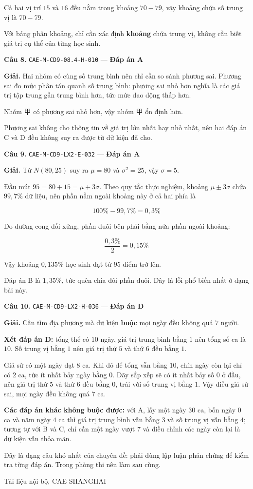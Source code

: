 \documentclass[11pt, a4paper]{article}
\begin{document}
Cả hai vị trí $15$ và $16$ đều nằm trong khoảng $70 - 79$, vậy khoảng chứa số trung vị là $70 - 79$.

 Với bảng phân khoảng, chỉ cần xác định \textbf{khoảng} chứa trung vị, không cần biết giá trị cụ thể của từng học sinh.

\textbf{Câu 8.} \texttt{CAE-M-CD9-08.4-H-010} — \textbf{Đáp án A}

\textbf{Giải.} Hai nhóm có cùng số trung bình nên chỉ cần so sánh phương sai. Phương sai đo mức phân tán quanh số trung bình: phương sai nhỏ hơn nghĩa là các giá trị tập trung gần trung bình hơn, tức mức dao động thấp hơn.

Nhóm 甲 có phương sai nhỏ hơn, vậy nhóm 甲 ổn định hơn.

 Phương sai không cho thông tin về giá trị lớn nhất hay nhỏ nhất, nên hai đáp án C và D đều không suy ra được từ dữ kiện đã cho.

\textbf{Câu 9.} \texttt{CAE-M-CD9-LX2-E-032} — \textbf{Đáp án A}

\textbf{Giải.} Từ $N(80, 25)$ suy ra $\mu = 80$ và $\sigma^2 = 25$, vậy $\sigma = 5$.

Đầu mút $95 = 80 + 15 = \mu + 3\sigma$. Theo quy tắc thực nghiệm, khoảng $\mu \pm 3\sigma$ chứa $99,7\%$ dữ liệu, nên phần nằm ngoài khoảng này ở cả hai phía là

$$100\% - 99,7\% = 0,3\%$$

Do đường cong đối xứng, phần đuôi bên phải bằng nửa phần ngoài khoảng:

$$\frac{0,3\%}{2} = 0,15\%$$

Vậy khoảng $0,135\%$ học sinh đạt từ $95$ điểm trở lên.

 Đáp án B là $1,35\%$, tức quên chia đôi phần đuôi. Đây là lỗi phổ biến nhất ở dạng bài này.

\textbf{Câu 10.} \texttt{CAE-M-CD9-LX2-H-036} — \textbf{Đáp án D}

\textbf{Giải.} Cần tìm địa phương mà dữ kiện \textbf{buộc} mọi ngày đều không quá $7$ người.

\textbf{Xét đáp án D:} tổng thể có $10$ ngày, giá trị trung bình bằng $1$ nên tổng số ca là $10$. Số trung vị bằng $1$ nên giá trị thứ $5$ và thứ $6$ đều bằng $1$.

Giả sử có một ngày đạt $8$ ca. Khi đó để tổng vẫn bằng $10$, chín ngày còn lại chỉ có $2$ ca, tức ít nhất bảy ngày bằng $0$. Dãy sắp xếp sẽ có ít nhất bảy số $0$ ở đầu, nên giá trị thứ $5$ và thứ $6$ đều bằng $0$, trái với số trung vị bằng $1$. Vậy điều giả sử sai, mọi ngày đều không quá $7$ ca.

\textbf{Các đáp án khác không buộc được:} với A, lấy một ngày $30$ ca, bốn ngày $0$ ca và năm ngày $4$ ca thì giá trị trung bình vẫn bằng $3$ và số trung vị vẫn bằng $4$; tương tự với B và C, chỉ cần một ngày vượt $7$ và điều chỉnh các ngày còn lại là dữ kiện vẫn thỏa mãn.

 Đây là dạng câu khó nhất của chuyên đề: phải dùng lập luận phản chứng để kiểm tra từng đáp án. Trong phòng thi nên làm sau cùng.
\vspace{0.8cm}
\begin{center}
{\footnotesize\color{cae_blue} Tài liệu nội bộ, CAE SHANGHAI}
\end{center}
\end{document}
